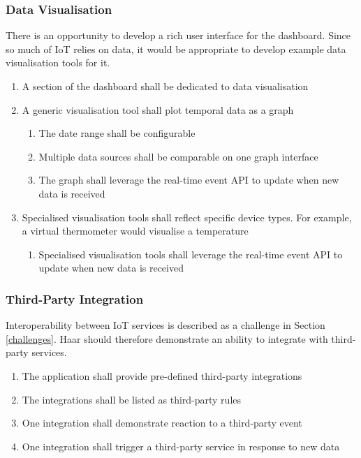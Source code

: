       \subsubsection{Data Visualisation}
        There is an opportunity to develop a rich user interface for the dashboard. Since so much of IoT relies on data, it would be appropriate to develop example data visualisation tools for it.

        \begin{enumerate}
          \item A section of the dashboard shall be dedicated to data visualisation
          \item A generic visualisation tool shall plot temporal data as a graph
          \begin{enumerate}
            \item The date range shall be configurable
            \item Multiple data sources shall be comparable on one graph interface
            \item The graph shall leverage the real-time event API to update when new data is received
          \end{enumerate}
          \item Specialised visualisation tools shall reflect specific device types. For example, a virtual thermometer would visualise a temperature
          \begin{enumerate}
            \item Specialised visualisation tools shall leverage the real-time event API to update when new data is received
          \end{enumerate}
        \end{enumerate}

      \subsubsection{Third-Party Integration}
        Interoperability between IoT services is described as a challenge in Section \ref{challenges}. Haar should therefore demonstrate an ability to integrate with third-party services.

        \begin{enumerate}
          \item The application shall provide pre-defined third-party integrations
          \item The integrations shall be listed as third-party rules
          \item One integration shall demonstrate reaction to a third-party event
          \item One integration shall trigger a third-party service in response to new data
        \end{enumerate}  

